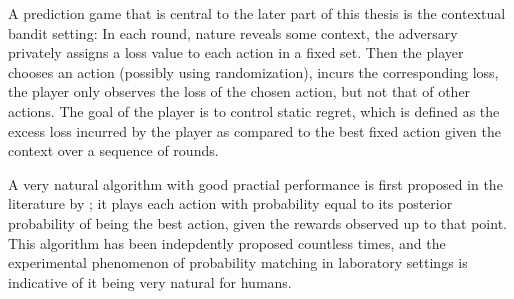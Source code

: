  A prediction game that is central to the later part of this thesis is the contextual bandit setting: In each round, nature reveals some context, the adversary privately assigns a loss value to each action in a fixed set.
 Then the player chooses an action (possibly using randomization), incurs the corresponding loss, the player only observes the loss of the chosen action, but not that of other actions.
 The goal of the player is to control static regret, which is defined as the excess loss incurred by the player as compared to the best fixed action given the context over a sequence of rounds.



 A very natural algorithm with good practial performance is first proposed in the literature by \cite{thompson:33}; it plays each action with probability equal to its posterior probability of being the best action, given the rewards observed up to that point.
 This algorithm has been indepdently proposed countless times, and the experimental phenomenon of probability matching in laboratory settings is indicative of it being very natural for humans.






